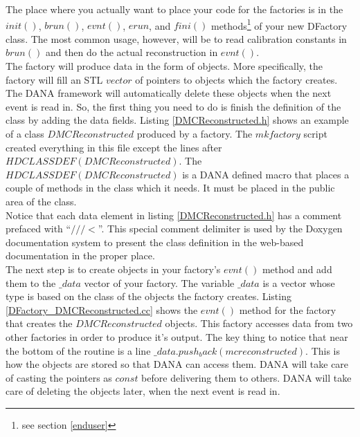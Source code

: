 \documentclass[12pt]{article}
\begin{document}
The place where you actually want to place your code for the
factories is in the $init()$, $brun()$, $evnt()$, $erun$, and $fini()$
methods\footnote{see section \ref{enduser}} of your new DFactory class.
The most common usage, however, will be to read calibration constants in
$brun()$ and then do the actual reconstruction in $evnt()$.\\

The factory will produce data in the form of objects. More specifically,
the factory will fill an STL $vector$ of pointers to objects
which the factory creates. The DANA framework will automatically delete
these objects when the next event is read in. So, the first thing
you need to do is finish the definition of the class by adding the
data fields. Listing \ref{DMCReconstructed.h} shows an example of a class
$DMCReconstructed$ produced by a factory. The $mkfactory$ script created
everything in this file except the lines after $HDCLASSDEF(DMCReconstructed)$.
The $HDCLASSDEF(DMCReconstructed)$
is a DANA defined macro that places a couple of methods in the
class which it needs. It must be placed in the public area of the class.\\

Notice that each data element in listing \ref{DMCReconstructed.h} has a
comment prefaced with ``$///<$''. This special comment delimiter
is used by the Doxygen documentation system to present the class
definition in the web-based documentation in the proper place.\\




The next step is to create objects in your factory's $evnt()$ method
and add them to the $\_data$ vector of your factory. The variable
$\_data$ is a vector whose type is based on the class of the objects
the factory creates. Listing \ref{DFactory_DMCReconstructed.cc} shows
the $evnt()$ method for the factory that creates the $DMCReconstructed$
objects. This factory accesses data from two other factories in
order to produce it's output. The key thing to notice that near the bottom
of the routine is a line $\_data.push_back(mcreconstructed)$. This
is how the objects are stored so that DANA can access them. DANA
will take care of casting the pointers as $const$ before delivering them
to others. DANA will take care of deleting the objects later, when
the next event is read in.\\
\end{document}
